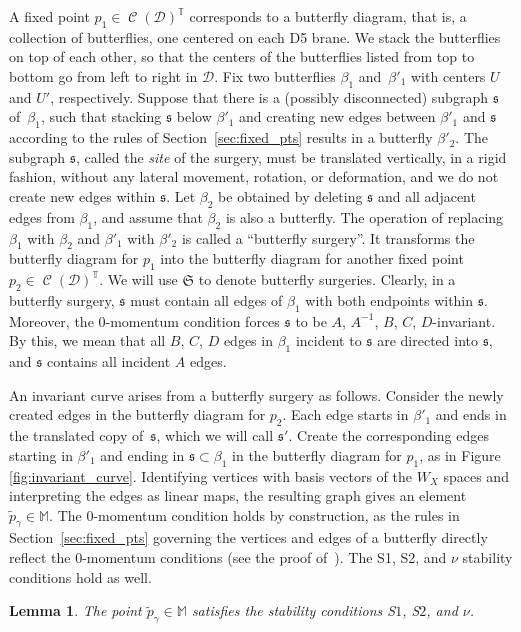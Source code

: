 \documentclass[pdftex]{sigma}
\numberwithin{equation}{section}
\newtheorem{Lemma}[Theorem]{Lemma}
\newcommand{\brane}{\mathcal D}
\newcommand{\torus}{\mathbb T}
\newcommand{\MM}{\mathbb M}
\newcommand{\but}{\beta}
\newcommand{\site}{\mathfrak s}
\newcommand{\surgery}{\mathfrak S}
\DeclareMathOperator{\bowvar}{\mathcal C}
\begin{document}
A fixed point $p_1\in \bowvar(\brane)^\torus$ corresponds to a butterfly diagram, that is, a collection of butterflies, one centered on each D5 brane. We stack the butterflies on top of each other, so that the centers of the butterflies listed from top to bottom go from left to right in $\brane$. Fix two butterflies $\but_1$ and~$\but'_1$ with centers $U$ and $U'$, respectively. Suppose that there is a (possibly disconnected) subgraph $\site$ of~$\but_1$, such that stacking $\site$ below $\but'_1$ and creating new edges between $\but'_1$ and $\site$ according to the rules of Section~\ref{sec:fixed_pts} results in a butterfly $\but'_2$. The subgraph $\site$, called the \emph{site} of the surgery, must be translated vertically, in a rigid fashion, without any lateral movement, rotation, or deformation, and we do not create new edges within $\site$. Let $\but_2$ be obtained by deleting $\site$ and all adjacent edges from $\but_1$, and assume that $\but_2$ is also a butterfly. The operation of replacing $\but_1$ with $\but_2$ and $\but'_1$ with $\but'_2$ is called a ``butterfly surgery''. It transforms the butterfly diagram for $p_1$ into the butterfly diagram for another fixed point $p_2\in \bowvar(\brane)^\torus$. We will use $\surgery$ to denote butterfly surgeries. Clearly, in a butterfly surgery, $\site$ must contain all edges of $\but_1$ with both endpoints within $\site$. Moreover, the 0-momentum condition forces $\site$ to be $A$, $A^{-1}$, $B$, $C$, $D$-invariant. By this, we mean that all $B$, $C$, $D$ edges in $\but_1$ incident to $\site$ are directed into $\site$, and $\site$ contains all incident $A$ edges.

An invariant curve arises from a butterfly surgery as follows. Consider the newly created edges in the butterfly diagram for $p_2$. Each edge starts in $\but'_1$ and ends in the translated copy of~$\site$, which we will call $\site'$. Create the corresponding edges starting in $\but'_1$ and ending in $\site\subset\but_1$ in the butterfly diagram for $p_1$, as in Figure \ref{fig:invariant_curve}. Identifying vertices with basis vectors of the $W_X$ spaces and interpreting the edges as linear maps, the resulting graph gives an element~${\tilde{p}_\gamma \in \MM}$. The 0-momentum condition holds by construction, as the rules in Section~\ref{sec:fixed_pts} governing the vertices and edges of a butterfly directly reflect the 0-momentum conditions (see the proof of~\cite[Theorem~4.8]{RS}). The S1, S2, and $\nu$ stability conditions hold as well.

\begin{Lemma} \label{lemma:type1_curve}
The point $\tilde{p}_\gamma \in \MM$ satisfies the stability conditions S$1$, S$2$, and $\nu$.
\end{Lemma}
\end{document}
